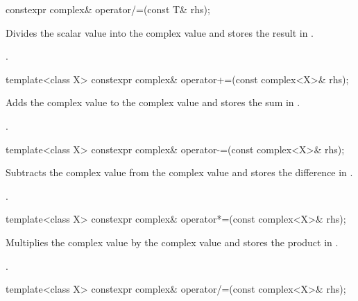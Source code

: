 %
\begin{itemdecl}
constexpr complex& operator/=(const T& rhs);
\end{itemdecl}

\begin{itemdescr}
\pnum
\effects
Divides the scalar value  into the complex value
and stores the result in
.

\pnum
\returns
{}.
\end{itemdescr}

%
\begin{itemdecl}
template<class X> constexpr complex& operator+=(const complex<X>& rhs);
\end{itemdecl}

\begin{itemdescr}
\pnum
\effects
Adds the complex value  to the complex value
and stores the sum in
.

\pnum
\returns
{}.
\end{itemdescr}

%
\begin{itemdecl}
template<class X> constexpr complex& operator-=(const complex<X>& rhs);
\end{itemdecl}

\begin{itemdescr}
\pnum
\effects
Subtracts the complex value  from the complex value
and stores the difference in
.

\pnum
\returns
{}.
\end{itemdescr}

%
\begin{itemdecl}
template<class X> constexpr complex& operator*=(const complex<X>& rhs);
\end{itemdecl}

\begin{itemdescr}
\pnum
\effects
Multiplies the complex value  by the complex value
and stores the product in
.

\pnum
\returns
{}.
\end{itemdescr}

%
\begin{itemdecl}
template<class X> constexpr complex& operator/=(const complex<X>& rhs);
\end{itemdecl}

